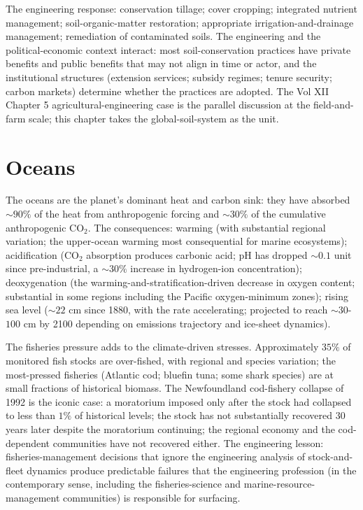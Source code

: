 The engineering response: conservation tillage; cover cropping; integrated nutrient management; soil-organic-matter restoration; appropriate irrigation-and-drainage management; remediation of contaminated soils. The engineering and the political-economic context interact: most soil-conservation practices have private benefits and public benefits that may not align in time or actor, and the institutional structures (extension services; subsidy regimes; tenure security; carbon markets) determine whether the practices are adopted. The Vol XII Chapter 5 agricultural-engineering case is the parallel discussion at the field-and-farm scale; this chapter takes the global-soil-system as the unit.

\section{Oceans}

The oceans are the planet's dominant heat and carbon sink: they have absorbed $\sim 90\%$ of the heat from anthropogenic forcing and $\sim 30\%$ of the cumulative anthropogenic CO$_2$. The consequences: warming (with substantial regional variation; the upper-ocean warming most consequential for marine ecosystems); acidification (CO$_2$ absorption produces carbonic acid; pH has dropped $\sim 0.1$ unit since pre-industrial, a $\sim 30\%$ increase in hydrogen-ion concentration); deoxygenation (the warming-and-stratification-driven decrease in oxygen content; substantial in some regions including the Pacific oxygen-minimum zones); rising sea level ($\sim 22$ cm since 1880, with the rate accelerating; projected to reach $\sim 30$-$100$ cm by 2100 depending on emissions trajectory and ice-sheet dynamics).

The fisheries pressure adds to the climate-driven stresses. Approximately $35\%$ of monitored fish stocks are over-fished, with regional and species variation; the most-pressed fisheries (Atlantic cod; bluefin tuna; some shark species) are at small fractions of historical biomass. The Newfoundland cod-fishery collapse \cite{paper:myers-cod-2007} of 1992 is the iconic case: a moratorium imposed only after the stock had collapsed to less than $1\%$ of historical levels; the stock has not substantially recovered $30$ years later despite the moratorium continuing; the regional economy and the cod-dependent communities have not recovered either. The engineering lesson: fisheries-management decisions that ignore the engineering analysis of stock-and-fleet dynamics produce predictable failures that the engineering profession (in the contemporary sense, including the fisheries-science and marine-resource-management communities) is responsible for surfacing.

